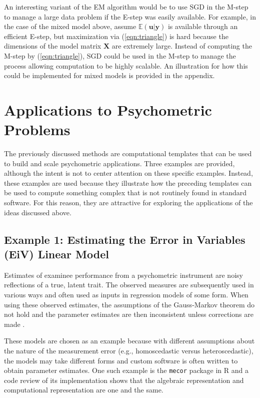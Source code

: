 \documentclass[12pt]{article}
\begin{document}
An interesting variant of the EM algorithm would be to use SGD in the M-step to manage a large data problem if the E-step was easily available. For example, in the case of the mixed model above, assume $\mathbb{E}(\bm{u}|\bm{y})$ is available through an efficient E-step, but maximization via (\ref{eqn:triangle}) is hard because the dimensions of the model matrix $\bm{X}$ are extremely large. Instead of computing the M-step by (\ref{eqn:triangle}), SGD could be used in the M-step to manage the process allowing computation to be highly scalable. An illustration for how this could be implemented for mixed models is provided in the appendix. 

\section*{Applications to Psychometric Problems}

The previously discussed methods are computational templates that can be used to build and scale psychometric applications. Three examples are provided, although the intent is not to center attention on these specific examples. Instead, these examples are used because they illustrate how the preceding templates can be used to compute something complex that is not routinely found in standard software. For this reason, they are attractive for exploring the applications of the ideas discussed above.  

\subsection*{Example 1: Estimating the Error in Variables (EiV) Linear Model}

Estimates of examinee performance from a psychometric instrument are noisy reflections of a true, latent trait. The observed measures are subsequently used in various ways and often used as inputs in regression models of some form. When using these observed estimates, the assumptions of the Gauss-Markov theorem do not hold and the parameter estimates are then inconsistent unless corrections are made \cite{doran:eiv,lockwood:eiv,nab}.   

These models are chosen as an example because with different assumptions about the nature of the measurement error (e.g., homoscedastic versus heteroscedastic), the models may take different forms and custom software is often written to obtain parameter estimates. One such example is the \texttt{mecor} \cite{nab} package in R and a code review of its implementation shows that the algebraic representation and computational representation are one and the same. 
\end{document}

